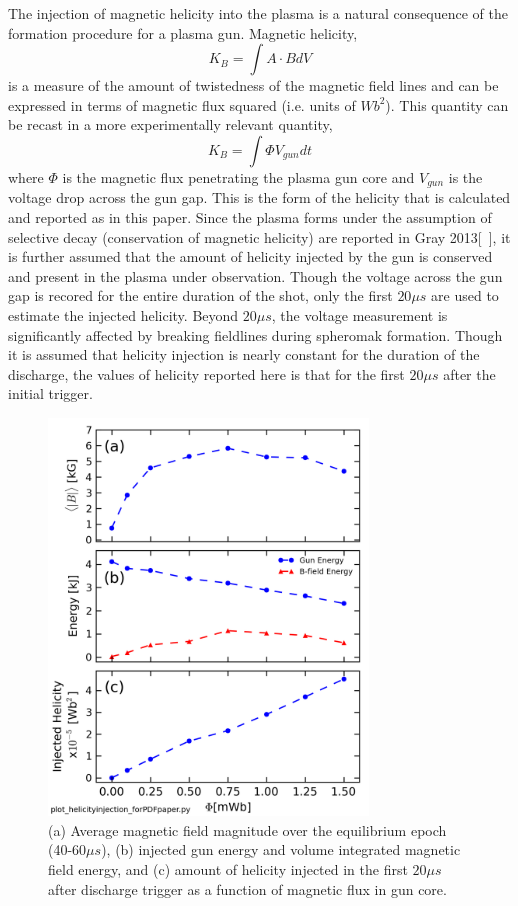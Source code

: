 \documentclass[aip,prl,amsmath,amssymb,reprint,superscriptaddress]{revtex4-1} %
\begin{document}
The injection of magnetic helicity into the plasma is a natural consequence of the formation procedure for a plasma gun. Magnetic helicity,
%
\begin{equation}
K_{B} = \int A \cdot B dV
\label{eq:helicity_th}
\end{equation}
%
is a measure of the amount of twistedness of the magnetic field lines and can be expressed in terms of magnetic flux squared (i.e. units of $Wb^{2}$). This quantity can be recast in a more experimentally relevant quantity, 
%
\begin{equation}
K_{B} = \int \Phi V_{gun} dt
\label{eq:helicity_exp}
\end{equation}
%
where $\Phi$ is the magnetic flux penetrating the plasma gun core and $V_{gun}$ is the voltage drop across the gun gap. This is the form of the helicity that is calculated and reported as in this paper. Since the plasma forms under the assumption of selective decay (conservation of magnetic helicity) are reported in Gray 2013[~\cite{Gray13}], it is further assumed that the amount of helicity injected by the gun is conserved and present in the plasma under observation. Though the voltage across the gun gap is recored for the entire duration of the shot, only the first $20 \mu s$ are used to estimate the injected helicity. Beyond $20 \mu s$, the voltage measurement is significantly affected by breaking fieldlines during spheromak formation. Though it is assumed that helicity injection is nearly constant for the duration of the discharge, the values of helicity reported here is that for the first $20 \mu s$ after the initial trigger.

\begin{figure}[!htbp]
\centerline{
\includegraphics[width=8.5cm]{helicity_scaling.png}}
\caption{\label{fig:helicity_scaling} (a) Average magnetic field magnitude over the equilibrium epoch (40-60$\mu s$), (b) injected gun energy and volume integrated magnetic field energy, and (c) amount of helicity injected in the first $20 \mu s$ after discharge trigger as a function of magnetic flux in gun core.}
\end{figure}
\end{document}

